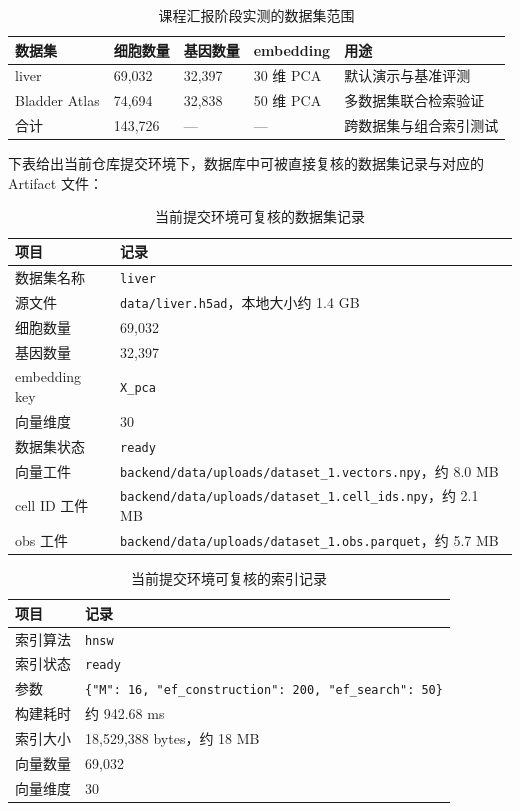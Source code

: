 \documentclass[UTF8,a4paper,12pt]{ctexrep}
\begin{document}
\begin{table}[H]
  \centering
  \caption{课程汇报阶段实测的数据集范围}
  \begin{tabularx}{0.95\textwidth}{lYYYY}
    \toprule
    数据集 & 细胞数量 & 基因数量 & embedding & 用途 \\
    \midrule
    liver & 69,032 & 32,397 & 30 维 PCA & 默认演示与基准评测 \\
    Bladder Atlas & 74,694 & 32,838 & 50 维 PCA & 多数据集联合检索验证 \\
    合计 & 143,726 & --- & --- & 跨数据集与组合索引测试 \\
    \bottomrule
  \end{tabularx}
\end{table}

下表给出当前仓库提交环境下，数据库中可被直接复核的数据集记录与对应的 Artifact 文件：

\begin{table}[H]
  \centering
  \caption{当前提交环境可复核的数据集记录}
  \begin{tabularx}{0.95\textwidth}{lY}
    \toprule
    项目 & 记录 \\
    \midrule
    数据集名称 & \texttt{liver} \\
    源文件 & \texttt{data/liver.h5ad}，本地大小约 1.4 GB \\
    细胞数量 & 69,032 \\
    基因数量 & 32,397 \\
    embedding key & \texttt{X\_pca} \\
    向量维度 & 30 \\
    数据集状态 & \texttt{ready} \\
    向量工件 & \texttt{backend/data/uploads/dataset\_1.vectors.npy}，约 8.0 MB \\
    cell ID 工件 & \texttt{backend/data/uploads/dataset\_1.cell\_ids.npy}，约 2.1 MB \\
    obs 工件 & \texttt{backend/data/uploads/dataset\_1.obs.parquet}，约 5.7 MB \\
    \bottomrule
  \end{tabularx}
\end{table}

\begin{table}[H]
  \centering
  \caption{当前提交环境可复核的索引记录}
  \begin{tabularx}{0.95\textwidth}{lY}
    \toprule
    项目 & 记录 \\
    \midrule
    索引算法 & \texttt{hnsw} \\
    索引状态 & \texttt{ready} \\
    参数 & \texttt{\{"M": 16, "ef\_construction": 200, "ef\_search": 50\}} \\
    构建耗时 & 约 942.68 ms \\
    索引大小 & 18,529,388 bytes，约 18 MB \\
    向量数量 & 69,032 \\
    向量维度 & 30 \\
    \bottomrule
  \end{tabularx}
\end{table}
\end{document}
